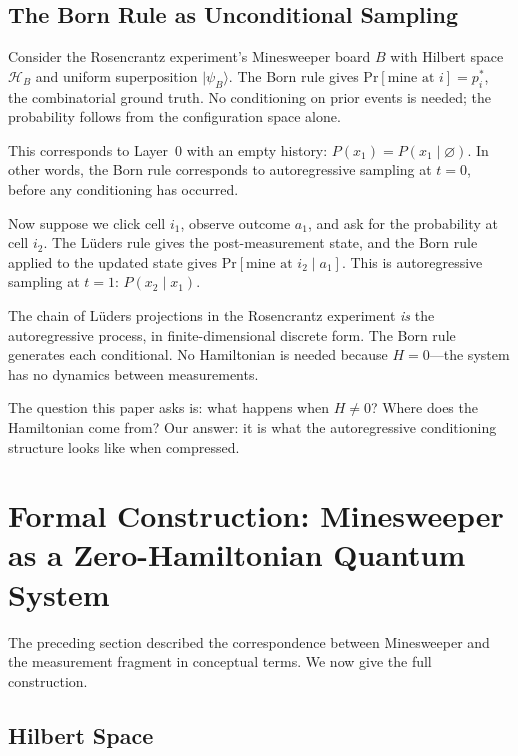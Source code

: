 \documentclass[12pt,a4paper]{article}
\theoremstyle{definition}
\theoremstyle{remark}
\newcommand{\Hil}{\mathcal{H}}
\newcommand{\ket}[1]{|#1\rangle}
\newcommand{\Prob}{\mathrm{Pr}}
\begin{document}
\subsection{The Born Rule as Unconditional Sampling}

Consider the Rosencrantz experiment's Minesweeper board $B$ with
Hilbert space $\Hil_B$ and uniform superposition $\ket{\psi_B}$.
The Born rule gives $\Prob[\text{mine at } i] = p_i^*$, the
combinatorial ground truth.  No conditioning on prior events is
needed; the probability follows from the configuration space alone.

This corresponds to Layer~0 with an empty history:
$P(x_1) = P(x_1 \mid \varnothing)$.  In other words, the Born rule
corresponds to autoregressive sampling at $t = 0$, before any
conditioning has occurred.

Now suppose we click cell $i_1$, observe outcome $a_1$, and ask for
the probability at cell $i_2$.  The Lüders rule gives the
post-measurement state, and the Born rule applied to the updated
state gives $\Prob[\text{mine at } i_2 \mid a_1]$.  This is
autoregressive sampling at $t = 1$: $P(x_2 \mid x_1)$.

The chain of Lüders projections in the Rosencrantz experiment
\emph{is} the autoregressive process, in finite-dimensional
discrete form.  The Born rule generates each conditional.  No
Hamiltonian is needed because $H = 0$---the system has no dynamics
between measurements.

The question this paper asks is: what happens when $H \neq 0$?
Where does the Hamiltonian come from?  Our answer: it is what the
autoregressive conditioning structure looks like when compressed.


\section{Formal Construction: Minesweeper as a Zero-Hamiltonian Quantum System}
\label{sec:hilbert-formal}

The preceding section described the correspondence between
Minesweeper and the measurement fragment in conceptual terms.
We now give the full construction.

\subsection{Hilbert Space}
\end{document}
